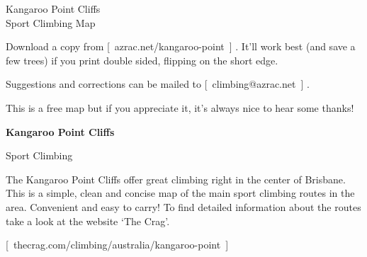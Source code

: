 \documentclass[10pt,a4paper,landscape]{article}
\newcommand{\myurl}[1] {
  \mbox{[ #1 ]}
}
\begin{document}
\setlength{\columnsep}{4cm}

\begin{multicols}{2}

\vspace*{60mm}

\begin{center}
  \begin{minipage}{60mm}
    \centering
    Kangaroo Point Cliffs \\
    Sport Climbing Map
  \end{minipage}
\end{center}

\begin{center}
  \begin{minipage}{60mm}
    \centering
    Download a copy from \myurl{azrac.net/kangaroo-point}.
    It'll work best (and save a few trees) if you print double sided, flipping on the short edge.
  \end{minipage}
\end{center}


\begin{center}
  \begin{minipage}{60mm}
    \centering
    Suggestions and corrections can be mailed to \myurl{climbing@azrac.net}.
  \end{minipage}
\end{center}


\begin{center}
  \begin{minipage}{60mm}
    \centering
    This is a free map but if you appreciate it, it's always nice to hear some thanks!
  \end{minipage}
\end{center}

\vspace*{20mm}

\vfill
\columnbreak




{\bf\Huge Kangaroo Point Cliffs}

{\Large Sport Climbing}

\vspace{5mm}

\normalsize

The Kangaroo Point Cliffs offer great climbing right in the center of Brisbane.
This is a simple, clean and concise map of the main sport climbing routes in the area.
Convenient and easy to carry!
To find detailed information about the routes take a look at the website `The Crag'.
\myurl{thecrag.com/climbing/australia/kangaroo-point}


\end{multicols}
\end{document}
